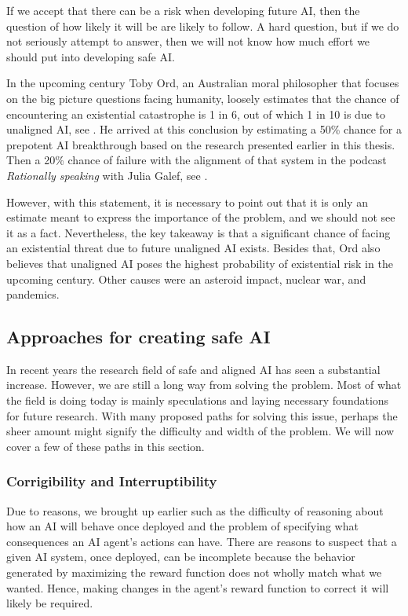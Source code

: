 \documentclass[12pt,A4]{report}
\theoremstyle{definition}
\begin{document}
If we accept that there can be a risk when developing future AI, then the question of how likely it will be are likely to follow. A hard question, but if we do not seriously attempt to answer, then we will not know how much effort we should put into developing safe AI. 

In the upcoming century Toby Ord, an Australian moral philosopher that focuses on the big picture questions facing humanity, loosely estimates that the chance of encountering an existential catastrophe is 1 in 6, out of which 1 in 10 is due to unaligned  AI, see \citet[c.6]{Precipice}. He arrived at this conclusion by estimating a 50\% chance for a prepotent AI breakthrough based on the research presented earlier in this thesis. Then a 20\% chance of failure with the alignment of that system in the podcast \textit{Rationally speaking} with Julia Galef, see \citet[26:15]{RationallySpeaking}. 

However, with this statement, it is necessary to point out that it is only an estimate meant to express the importance of the problem, and we should not see it as a fact. Nevertheless, the key takeaway is that a significant chance of facing an existential threat due to future unaligned AI exists. Besides that, Ord also believes that unaligned AI poses the highest probability of existential risk in the upcoming century. Other causes were an asteroid impact, nuclear war, and pandemics. 


\subsection{Approaches for creating safe AI}
In recent years the research field of safe and aligned AI has seen a substantial increase. However, we are still a long way from solving the problem. Most of what the field is doing today is mainly speculations and laying necessary foundations for future research. With many proposed paths for solving this issue, perhaps the sheer amount might signify the difficulty and width of the problem. We will now cover a few of these paths in this section.


\subsubsection{Corrigibility and Interruptibility }
Due to reasons, we brought up earlier such as the difficulty of reasoning about how an AI will behave once deployed and the problem of specifying what consequences an AI agent's actions can have. There are reasons to suspect that a given AI system, once deployed, can be incomplete because the behavior generated by maximizing the reward function does not wholly match what we wanted. Hence, making changes in the agent's reward function to correct it will likely be required.  
\end{document}
